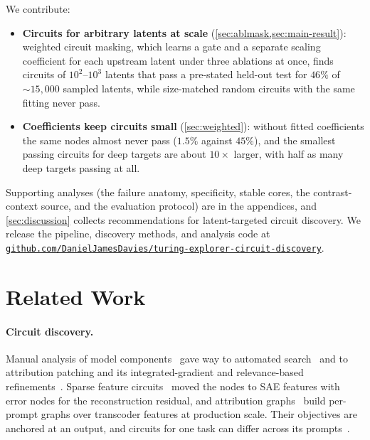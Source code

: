 \documentclass[10pt]{article}
\begin{document}
We contribute:
\begin{itemize}
\item \textbf{Circuits for arbitrary latents at scale} (\cref{sec:ablmask,sec:main-result}): weighted circuit masking, which learns a gate and a separate scaling coefficient for each upstream latent under three ablations at once, finds circuits of $10^{2}$--$10^{3}$ latents that pass a pre-stated held-out test for $46\%$ of ${\sim}15{,}000$ sampled latents, while size-matched random circuits with the same fitting never pass.
\item \textbf{Coefficients keep circuits small} (\cref{sec:weighted}): without fitted coefficients the same nodes almost never pass ($1.5\%$ against $45\%$), and the smallest passing circuits for deep targets are about $10\times$ larger, with half as many deep targets passing at all.
\end{itemize}
Supporting analyses (the failure anatomy, specificity, stable cores, the contrast-context source, and the evaluation protocol) are in the appendices, and \cref{sec:discussion} collects recommendations for latent-targeted circuit discovery.
We release the pipeline, discovery methods, and analysis code at \href{https://github.com/DanielJamesDavies/turing-explorer-circuit-discovery}{\nolinkurl{github.com/DanielJamesDavies/turing-explorer-circuit-discovery}}.

\section{Related Work}

\paragraph{Circuit discovery.}
Manual analysis of model components~\citep{olah2020zoom, wang2023interpretability} gave way to automated search~\citep{conmy2023towards} and to attribution patching and its integrated-gradient and relevance-based refinements~\citep{nanda2023attribution, syed2023attribution, kramar2024atp, hanna2024faith, rezaeijafari2025relp}.
Sparse feature circuits~\citep{marks2025sparse} moved the nodes to SAE features with error nodes for the reconstruction residual, and attribution graphs~\citep{ameisen2025circuit, lindsey2025biology} build per-prompt graphs over transcoder features at production scale.
Their objectives are anchored at an output, and circuits for one task can differ across its prompts~\citep{makou2026many}.
\end{document}
